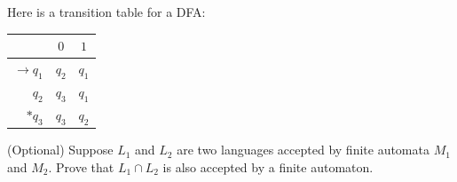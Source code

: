 \documentclass[10pt]{homework}
\begin{document}
\begin{problem}
  Here is a transition table for a DFA:\@
  \begin{table}[H]
    \centering
    \begin{tabular}{r||c|c} %
      & $0$ & $1$\\\hline\hline %
      $\rightarrow q_{1}$ & $q_{2}$ & $q_{1}$\\
      $q_{2}$ & $q_{3}$ & $q_{1}$\\
      $*q_{3}$ & $q_{3}$ & $q_{2}$
    \end{tabular}
  \end{table}
\end{problem}

\begin{solution}

\end{solution}

\begin{problem} (Optional) Suppose $L_{1}$ and $L_{2}$ are two languages accepted
  by finite automata $M_{1}$ and $M_{2}$.
  Prove that $L_{1} \cap L_{2}$ is also accepted by a finite automaton.
\end{problem}

\begin{solution}

\end{solution}
\end{document}

